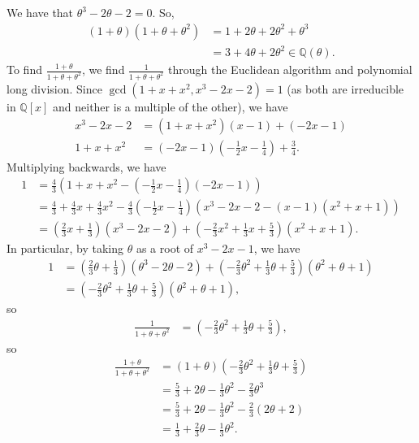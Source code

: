 \documentclass[11pt]{extarticle}
\newcommand{\Q}{\mathbb{Q}}
\begin{document}
  We have that $\theta^3 - 2\theta - 2 = 0$. So,
  \begin{align*}
    (1+\theta)(1+\theta + \theta^2) &= 1 + 2\theta + 2\theta^2 + \theta^3\\
                                    &= 3 + 4\theta + 2\theta^2 \in \Q(\theta).
  \end{align*}
  To find $\frac{1+\theta}{1+\theta+\theta^2}$, we find $\frac{1}{1+\theta+\theta^2}$ through the Euclidean algorithm and polynomial long division. Since $\gcd(1+x+x^2,x^3-2x-2) = 1$ (as both are irreducible in $\Q[x]$ and neither is a multiple of the other), we have
  \begin{align*}
    x^3 - 2x - 2 &= (1+x+x^2)(x-1) + (-2x-1)\\
    1+x+x^2 &= (-2x-1)\left(-\frac{1}{2}x - \frac{1}{4}\right) + \frac{3}{4}.
  \end{align*}
  Multiplying backwards, we have
  \begin{align*}
    1 &= \frac{4}{3}\left(1+x+x^2 -\left(-\frac{1}{2}x - \frac{1}{4}\right)(-2x-1)\right)\\
      &= \frac{4}{3} + \frac{4}{3}x + \frac{4}{3}x^2 - \frac{4}{3}\left(-\frac{1}{2}x - \frac{1}{4}\right)\left(x^3 - 2x - 2 - (x-1)(x^2 + x + 1)\right)\\
      &= \left(\frac{2}{3}x + \frac{1}{3}\right)\left(x^3-2x-2\right) + \left(-\frac{2}{3}x^2 + \frac{1}{3}x + \frac{5}{3}\right)\left(x^2 + x + 1\right).
  \end{align*}
  In particular, by taking $\theta$ as a root of $x^3 -2x -1$, we have
  \begin{align*}
    1 &= \left(\frac{2}{3}\theta + \frac{1}{3}\right)\left(\theta^3-2\theta-2\right) + \left(-\frac{2}{3}\theta^2 + \frac{1}{3}\theta + \frac{5}{3}\right)\left(\theta^2 + \theta + 1\right)\\
      &= \left(-\frac{2}{3}\theta^2 + \frac{1}{3}\theta + \frac{5}{3}\right)\left(\theta^2 + \theta + 1\right),
  \end{align*}
  so
  \begin{align*}
    \frac{1}{1+\theta + \theta^2} &= \left(-\frac{2}{3}\theta^2 + \frac{1}{3}\theta + \frac{5}{3}\right),
  \end{align*}
  so
  \begin{align*}
    \frac{1+\theta}{1+\theta+\theta^2} &= (1+\theta)\left(-\frac{2}{3}\theta^2 + \frac{1}{3}\theta + \frac{5}{3}\right)\\
                                       &= \frac{5}{3} + 2\theta - \frac{1}{3}\theta^2 - \frac{2}{3}\theta^3\\
                                       &= \frac{5}{3} + 2\theta - \frac{1}{3}\theta^2 - \frac{2}{3}\left(2\theta + 2\right)\\
                                       &= \frac{1}{3} + \frac{2}{3}\theta - \frac{1}{3}\theta^2.
  \end{align*}
\end{document}
